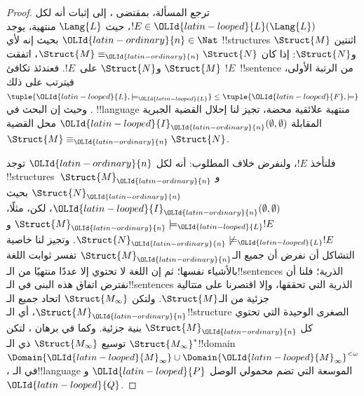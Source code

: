 \documentclass[../../../include/open-logic-section]{subfiles}
\begin{document}
\begin{proof}
ترجع المسألة، بمقتضى ، إلى إثبات أنه لكل
$!E \in \OLId{latin-looped}{L}(\Lang{L})$، حيث $\Lang{L}$ منتهية، يوجد $\OLId{latin-ordinary}{n} \in \Nat$ بحيث
إنه لأي !!{structure}s اثنتين $\Struct{M}$ و$\Struct{N}$: إذا كان
$\Struct{M} \equiv_\OLId{latin-ordinary}{n} \Struct{N}$، اتفقت $\Struct{M}$ و$\Struct{N}$
على~$!E$. فعندئذ تكافئ $!E$~!!{sentence} من الرتبة الأولى، فيترتب على ذلك
$\tuple{\OLId{latin-looped}{L},\models_\OLId{latin-looped}{L}} \le \tuple{\OLId{latin-looped}{F},\models}$. وحيث إن البحث في
!!{language} منتهية علائقية محضة، تجيز لنا
 إحلال القضية الجبرية المقابلة
$\OLId{latin-looped}{I}_\OLId{latin-ordinary}{n}(\emptyset,\emptyset)$ محل القضية
$\Struct{M} \equiv_\OLId{latin-ordinary}{n} \Struct{N}$.

فلنأخذ $!E$، ولنفرض خلاف المطلوب: أنه لكل $\OLId{latin-ordinary}{n}$ توجد
!!{structure}s~$\Struct{M}_\OLId{latin-ordinary}{n}$ و$\Struct{N}_\OLId{latin-ordinary}{n}$ بحيث
$\OLId{latin-looped}{I}_\OLId{latin-ordinary}{n}(\emptyset,\emptyset)$، لكن، مثلًا،
$\Struct{M}_\OLId{latin-ordinary}{n} \models_\OLId{latin-looped}{L} !E$ و$\Struct{N}_\OLId{latin-ordinary}{n} \not\models_\OLId{latin-looped}{L} !E$. وتجيز لنا خاصية
التشاكل أن نفرض أن جميع الـ$\Struct{M}_\OLId{latin-ordinary}{n}$ تفسر ثوابت اللغة
بالأشياء نفسها؛ ثم إن اللغة لا تحتوي إلا عددًا منتهيًا من
الـ!!{sentence}s الذرية؛ فلنا أن نفترض اتفاق هذه البنى في الـ!!{sentence}s الذرية
التي تحققها، وإلا اقتصرنا على متتالية جزئية من الـ$\Struct{M}$. ولتكن
$\Struct{M_\infty}$ اتحاد جميع الـ$\Struct{M}_\OLId{latin-ordinary}{n}$، أي الـ!!{structure}
الصغرى الوحيدة التي تحتوي كل $\Struct{M}_\OLId{latin-ordinary}{n}$ بنية جزئية. وكما في برهان
، لتكن $\Struct{M_\infty}^*$ توسيع
$\Struct{M_\infty}$ ذي الـ!!{domain}
$\Domain{\OLId{latin-looped}{M}_\infty} \cup \Domain{\OLId{latin-looped}{M}_\infty}^{<\omega}$، في
الـ!!{language} الموسعة التي تضم محمولي الوصل $\OLId{latin-looped}{P}$ و$\OLId{latin-looped}{Q}$.


\end{proof}
\end{document}
